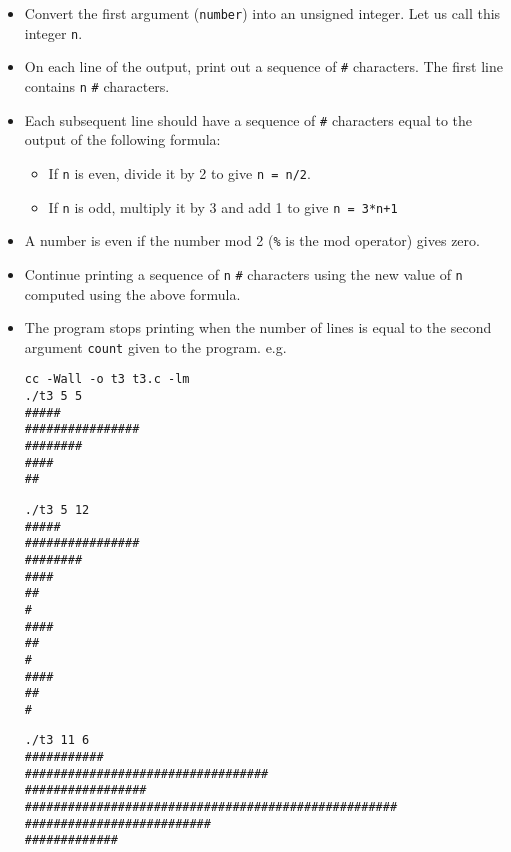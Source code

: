 \documentclass[11pt]{article}
\begin{document}
\begin{exe}
\begin{itemize}
\item Convert the first argument (\texttt{number}) into an unsigned
integer. Let us call this integer \texttt{n}.

\item On each line of the output, print out a sequence of \texttt{\#}
characters. The first line contains \texttt{n} \texttt{\#} characters.

\item Each subsequent line should have a sequence of \texttt{\#}
characters equal to the output of the following formula:

\begin{itemize}
\item If \texttt{n} is even, divide it by 2 to give \texttt{n = n/2}.
\item If \texttt{n} is odd, multiply it by 3 and add 1 to give \texttt{n = 3*n+1}
\end{itemize}

\item A number is even if the number mod 2 (\texttt{\%} is the mod operator) gives zero.

\item Continue printing a sequence of \texttt{n} \texttt{\#} characters
using the new value of \texttt{n} computed using the above formula.

\item The program stops printing when the number of lines is equal
to the second argument \texttt{count} given to the program. e.g.

\footnotesize
\smallskip
\begin{minipage}{1.6in}
\begin{verbatim}
cc -Wall -o t3 t3.c -lm
./t3 5 5
#####
################
########
####
##
\end{verbatim}
\end{minipage}
\begin{minipage}{1.3in}
\begin{verbatim}
./t3 5 12
#####
################
########
####
##
#
####
##
#
####
##
#
\end{verbatim}
\end{minipage}
\begin{minipage}{2in}
\begin{verbatim}
./t3 11 6
###########
##################################
#################
####################################################
##########################
#############
\end{verbatim}
\end{minipage}


\end{itemize}
\end{exe}
\end{document}
